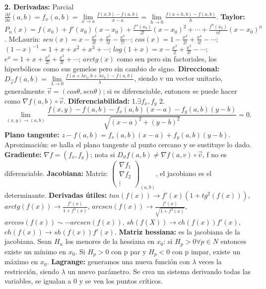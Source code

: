 \documentclass[a4paper, landscape, 11pt]{article}
\begin{document}
\textbf{2. Derivadas:} Parcial $\frac{\partial f}{\partial x}(a,b) = f_{x}(a,b) = \lim\limits_{x \rightarrow a} \frac{f(x,b) - f(a,b)}{x - a} = \lim\limits_{h \rightarrow 0} \frac{f(a + h, b) - f(a,b)}{h}$. \textbf{Taylor:} $P_{n}(x) = f(x_{0}) + f'(x_{0})(x-x_{0}) + \frac{f''(x_{0})}{2!}(x-x_{0})^{2} + \cdots + \frac{f^{n}(x_0)}{n!}(x-x_{0})^{n}$. McLaurin: $sen(x) = x - \frac{x^3}{3!} + \frac{x^5}{5!} - \frac{x^7}{7!} \cdots$; $cos(x) = 1 - \frac{x^{2}}{2!} + \frac{x^{4}}{4!}- \cdots$; $(1 - x)^{-1} = 1 + x + x^{2} + x^{3} + \cdots$; $log(1 + x) = x - \frac{x^{2}}{2} + \frac{x^{3}}{3!}- \cdots$; $e^{x} = 1 + x + \frac{x^{2}}{2!} + \frac{x^{3}}{3!} + \cdots$; $arctg(x)$ como sen pero sin factoriales, los hiperbólicos como sus gemelos pero sin cambio de signo. \textbf{Direccional:} $D_{\vec{v}} f(a,b) = \lim\limits_{\lambda \rightarrow 0} \frac{f(a + \lambda v_1, b + \lambda v_2) - f(a,b)}{\lambda}$, siendo v un vector unitario, generalmente $\vec{v} = (cos \theta, sen \theta)$; si es diferenciable, entonces se puede hacer como $\nabla f(a,b) \circ \vec{v}$. \textbf{Diferenciabilidad:} 1.$\exists f_{x}, f_{y}$ 2. $\lim\limits_{(x,y) \rightarrow (a,b)} \dfrac{f(x,y) - f(a,b) - f_{x}(a,b)(x-a) - f_{y}(a,b)(y-b)}{\sqrt{(x-a)^{2} + (y-b)^{2}}} = 0$. \textbf{Plano tangente:} $z - f(a,b) = f_{x}(a,b)(x-a) + f_{y}(a,b)(y-b)$. Aproximación: se halla el plano tangente al punto cercano y se sustituye lo dado. \textbf{Gradiente:} $\nabla f = (f_{x}, f_{y})$; nota si $D_{\vartheta}f(a,b) \neq \nabla f(a,v) \circ \vec{v}$, f no es diferenciable. \textbf{Jacobiana:}
Matriz:
$\left(\begin{array}{c}
	\nabla f_{1} \\
	\nabla f_{2} \\
	\vdots
\end{array}\right)_{(a,b)}$, el jacobiano es el determinante. \textbf{Derivadas útiles:} $tan(f(x)) \to f'(x)(1 + tg^{2}(f(x)))$, $arctg(f(x)) \to \frac{f'(x)}{1 + f^{2}(x)}$, $arcsen(f(x)) \to \frac{f'(x)}{\sqrt{1 + f^{2}(x)}}$, $arccos(f(x)) \sim - arcsen(f(x))$, $sh(f(X)) \to ch(f(x))f'(x)$, $ch(f(x)) \to sh(f(x))f'(x)$. \textbf{Matriz hessiana:} es la jacobiana de la jacobiana.  Sean $H_n$ los menores de la hessiana en $x_0$: si $H_{p} > 0 \forall p \in N$ entonces existe un mínimo en $x_0$. Si $H_{p} > 0$ con p par y $H_{p} < 0$ con p impar, existe un máximo en $x_0$. \textbf{Lagrange:} generamos una nueva función con $\lambda$ veces la restricción, siendo $\lambda$ un nuevo parámetro. Se crea un sistema derivando todas las variables, se igualan a 0 y se ven los puntos críticos.
\\
\end{document}
